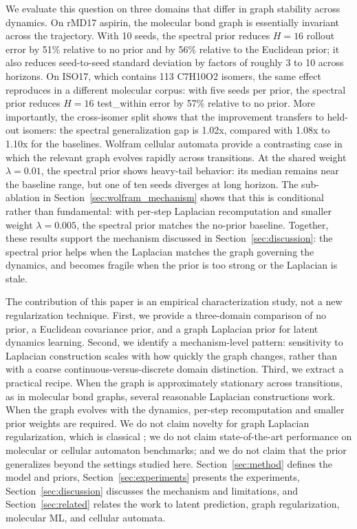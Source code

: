 We evaluate this question on three domains that differ in graph stability across dynamics. On rMD17 aspirin, the molecular bond graph is essentially invariant across the trajectory. With 10 seeds, the spectral prior reduces \(H=16\) rollout error by 51\% relative to no prior and by 56\% relative to the Euclidean prior; it also reduces seed-to-seed standard deviation by factors of roughly 3 to 10 across horizons. On ISO17, which contains 113 C7H10O2 isomers, the same effect reproduces in a different molecular corpus: with five seeds per prior, the spectral prior reduces \(H=16\) test\_within error by 57\% relative to no prior. More importantly, the cross-isomer split shows that the improvement transfers to held-out isomers: the spectral generalization gap is 1.02x, compared with 1.08x to 1.10x for the baselines. Wolfram cellular automata provide a contrasting case in which the relevant graph evolves rapidly across transitions. At the shared weight \(\lambda=0.01\), the spectral prior shows heavy-tail behavior: its median remains near the baseline range, but one of ten seeds diverges at long horizon. The sub-ablation in Section~\ref{sec:wolfram_mechanism} shows that this is conditional rather than fundamental: with per-step Laplacian recomputation and smaller weight \(\lambda=0.005\), the spectral prior matches the no-prior baseline. Together, these results support the mechanism discussed in Section~\ref{sec:discussion}: the spectral prior helps when the Laplacian matches the graph governing the dynamics, and becomes fragile when the prior is too strong or the Laplacian is stale.

The contribution of this paper is an empirical characterization study, not a new regularization technique. First, we provide a three-domain comparison of no prior, a Euclidean covariance prior, and a graph Laplacian prior for latent dynamics learning. Second, we identify a mechanism-level pattern: sensitivity to Laplacian construction scales with how quickly the graph changes, rather than with a coarse continuous-versus-discrete domain distinction. Third, we extract a practical recipe. When the graph is approximately stationary across transitions, as in molecular bond graphs, several reasonable Laplacian constructions work. When the graph evolves with the dynamics, per-step recomputation and smaller prior weights are required. We do not claim novelty for graph Laplacian regularization, which is classical \cite{belkin2003}; we do not claim state-of-the-art performance on molecular or cellular automaton benchmarks; and we do not claim that the prior generalizes beyond the settings studied here. Section~\ref{sec:method} defines the model and priors, Section~\ref{sec:experiments} presents the experiments, Section~\ref{sec:discussion} discusses the mechanism and limitations, and Section~\ref{sec:related} relates the work to latent prediction, graph regularization, molecular ML, and cellular automata.

